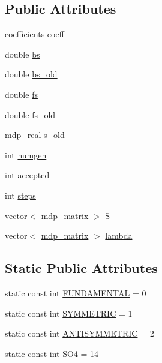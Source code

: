 \subsection*{Public Attributes}
\begin{DoxyCompactItemize}
\item 
\hyperlink{classcoefficients}{coefficients} \hyperlink{class_h_m_c_v_t_k_a6b8e384e877ba74f193b28c6799ca837}{coeff}
\item 
double \hyperlink{class_h_m_c_v_t_k_a6aa71649ab9cc4d95094b7ff552ae0f0}{bs}
\item 
double \hyperlink{class_h_m_c_v_t_k_a8be797b779ed5996e1a2f1b357ac06d0}{bs\+\_\+old}
\item 
double \hyperlink{class_h_m_c_v_t_k_a5c0664c21a199655f601be5f7a777612}{fs}
\item 
double \hyperlink{class_h_m_c_v_t_k_ae9cfa8c2ba17452e2002c1e127ad6844}{fs\+\_\+old}
\item 
\hyperlink{mdp__global__vars_8h_a69d96b74c791e0bbdb888b3913a69450}{mdp\+\_\+real} \hyperlink{class_h_m_c_v_t_k_a73b3049364eea7f9f0b57594ef48dbf6}{s\+\_\+old}
\item 
int \hyperlink{class_h_m_c_v_t_k_a881b6b88d434759d784a66eab366a6fd}{numgen}
\item 
int \hyperlink{class_h_m_c_v_t_k_a113313b896f2ba1cfbb12fab060e30c3}{accepted}
\item 
int \hyperlink{class_h_m_c_v_t_k_ac8beb987b81e5cb2d1efac1c972f7da5}{steps}
\item 
vector$<$ \hyperlink{classmdp__matrix}{mdp\+\_\+matrix} $>$ \hyperlink{class_h_m_c_v_t_k_a3462cb4648e6c2994fc69d1f709858ef}{S}
\item 
vector$<$ \hyperlink{classmdp__matrix}{mdp\+\_\+matrix} $>$ \hyperlink{class_h_m_c_v_t_k_ae84586a5a07180518b7d0eacf2a90265}{lambda}
\end{DoxyCompactItemize}
\subsection*{Static Public Attributes}
\begin{DoxyCompactItemize}
\item 
static const int \hyperlink{class_h_m_c_v_t_k_affeaaf576332c14490744646825d1834}{F\+U\+N\+D\+A\+M\+E\+N\+T\+AL} = 0
\item 
static const int \hyperlink{class_h_m_c_v_t_k_a6e113bbf213d3912e17705edaad6abdc}{S\+Y\+M\+M\+E\+T\+R\+IC} = 1
\item 
static const int \hyperlink{class_h_m_c_v_t_k_affb37f648aabe12dc443875541d592a2}{A\+N\+T\+I\+S\+Y\+M\+M\+E\+T\+R\+IC} = 2
\item 
static const int \hyperlink{class_h_m_c_v_t_k_a742969bcc172c8de8bd0b9b7968569dd}{S\+O4} = 14
\end{DoxyCompactItemize}


